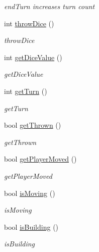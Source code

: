 \begin{DoxyCompactItemize}
\begin{DoxyCompactList}\small\item\em end\-Turn increases turn count \end{DoxyCompactList}\item 
int \hyperlink{class_game_1_1_game_event_handler_a261195d24462d7d0921cf38cea1b2c2b}{throw\-Dice} ()
\begin{DoxyCompactList}\small\item\em throw\-Dice \end{DoxyCompactList}\item 
int \hyperlink{class_game_1_1_game_event_handler_a991f80f0f775aafebcda3648d23bcd34}{get\-Dice\-Value} ()
\begin{DoxyCompactList}\small\item\em get\-Dice\-Value \end{DoxyCompactList}\item 
int \hyperlink{class_game_1_1_game_event_handler_a6ec04e17ce2ad5e01e7ff295228f2e93}{get\-Turn} ()
\begin{DoxyCompactList}\small\item\em get\-Turn \end{DoxyCompactList}\item 
bool \hyperlink{class_game_1_1_game_event_handler_adc5c0fcca540aecee10f4f686cd75a8a}{get\-Thrown} ()
\begin{DoxyCompactList}\small\item\em get\-Thrown \end{DoxyCompactList}\item 
bool \hyperlink{class_game_1_1_game_event_handler_a92a48620bbbed7ada1723c4fccd1cd12}{get\-Player\-Moved} ()
\begin{DoxyCompactList}\small\item\em get\-Player\-Moved \end{DoxyCompactList}\item 
bool \hyperlink{class_game_1_1_game_event_handler_a9795d3f9e717f6c25f4ce04364f805b7}{is\-Moving} ()
\begin{DoxyCompactList}\small\item\em is\-Moving \end{DoxyCompactList}\item 
bool \hyperlink{class_game_1_1_game_event_handler_af885960b5f0a12cfb8d0a66aaabb830d}{is\-Building} ()
\begin{DoxyCompactList}\small\item\em is\-Building \end{DoxyCompactList}\item 

\end{DoxyCompactItemize}
